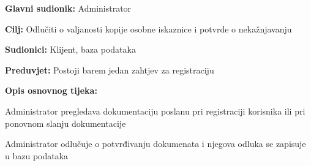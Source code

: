 						\noindent {}
						\begin{packed_item}
							
							\item \textbf{Glavni sudionik: } Administrator
							\item  \textbf{Cilj: } Odlučiti o valjanosti kopije osobne iskaznice i potvrde o nekažnjavanju
							\item  \textbf{Sudionici: }Klijent, baza podataka
							\item  \textbf{Preduvjet: }Postoji barem jedan zahtjev za registraciju 
							\item  \textbf{Opis osnovnog tijeka:}
							
							\item[] \begin{packed_enum}
								
								\item Administrator pregledava dokumentaciju poslanu pri registraciji korisnika ili pri ponovnom slanju dokumentacije 
								\item Administrator odlučuje o potvrđivanju dokumenata i njegova odluka se zapisuje u bazu podataka
								
							\end{packed_enum}
						\end{packed_item}
						\noindent {}
